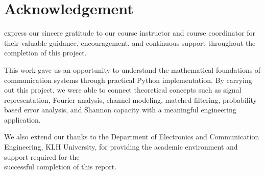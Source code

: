 \chapter*{Acknowledgement}

\sloppy express our sincere gratitude to 
our course instructor and course coordinator 
for their valuable guidance, encouragement, 
and continuous support throughout the completion of this project.

This work gave us an opportunity to understand the mathematical foundations of communication systems through practical Python implementation. By carrying out this project, we were able to connect theoretical concepts such as signal representation, Fourier analysis, channel modeling, matched filtering, probability-based error analysis, and Shannon capacity with a meaningful engineering application.

We also extend our thanks to the Department of Electronics and Communication Engineering, KLH University, for providing the academic environment and support required for the
\\successful completion of this report.

\clearpage